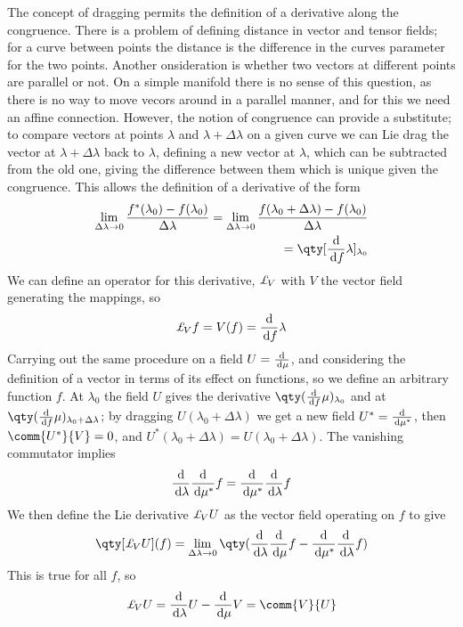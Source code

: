 The concept of dragging permits the definition of a derivative along
the congruence. There is a problem of defining distance in vector and
tensor fields; for a curve between points the distance is the
difference in the curves parameter for the two points. Another
onsideration is whether two vectors at different points are parallel
or not. On a simple manifold there is no sense of this question, as
there is no way to move vecors around in a parallel manner, and for
this we need an affine connection. However, the notion of congruence
can provide a substitute; to compare vectors at points $\lambda$ and
$\lambda + \Delta \lambda$ on a given curve we can Lie drag the vector
at $\lambda + \Delta \lambda$ back to $\lambda$, defining a new vector
at $\lambda$, which can be subtracted from the old one, giving the
difference between them which is unique given the congruence. This allows the definition of a derivative of the form
\begin{equation}
  \label{eq:18}
  \begin{split}
     \lim_{\Delta \lambda \to 0} \frac{f^{*}(\lambda_0) - f(\lambda_0)}{\Delta \lambda} = \lim_{\Delta \lambda \to 0} \frac{f(\lambda_0 + \Delta \lambda) - f(\lambda_0)}{\Delta \lambda} \\= \qty[ \dv{f}{\lambda}]_{\lambda_0}
   \end{split}
\end{equation}
We can define an operator for this derivative, $\ld{V}{}$ with $V$ the
vector field generating the mappings, so
\begin{equation}
  \label{eq:19}
  \ld{V}{f} = V(f) = \dv{f}{\lambda}
\end{equation}
Carrying out the same procedure on a field $U = \frac{\mathrm{d}}{\,\mathrm{d} \mu}$, and
considering the definition of a vector in terms of its effect on
functions, so we define an arbitrary function $f$. At $\lambda_0$ the
field $U$ gives the derivative $\qty(\dv{f}{\mu})_{\lambda_0}$ and at
$\qty(\dv{f}{\mu})_{\lambda_0 + \Delta \lambda}$; by dragging
$U(\lambda_0 + \Delta \lambda)$ we get a new field
$U^{*}=\frac{\mathrm{d}}{\,\mathrm{d} \mu^{*}}$, then $\comm{U^{*}}{V} = 0$, and $U^{*}(\lambda_0
+ \Delta \lambda) = U(\lambda_0+\Delta \lambda)$. The vanishing
commutator implies
\begin{equation}
  \label{eq:20}
  \frac{\mathrm{d}}{\,\mathrm{d} \lambda} \frac{\mathrm{d}}{\,\mathrm{d} \mu^{*}} f = \frac{\mathrm{d}}{\,\mathrm{d} \mu^{*}} \frac{\mathrm{d}}{\,\mathrm{d} \lambda} f
\end{equation}
We then define the Lie derivative $\ld{V}{U}$ as the vector field
operating on $f$ to give
\begin{equation}
  \label{eq:21}
  \qty[ \ld{V}{U}](f) = \lim_{\Delta \lambda \to 0} \qty( \dv{\lambda} \dv{\mu} f - \dv{\mu^{*}} \dv{\lambda} f)
\end{equation}
This is true for all $f$, so
\begin{equation}
  \label{eq:22}
  \ld{V}{U} = \dv{\lambda} U - \dv{\mu} V = \comm{V}{U}
\end{equation}

